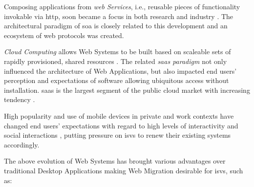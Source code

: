 Composing applications from \emph{\Gls{web} Services}, i.e., reusable pieces of functionality invokable via \gls{http}, soon became a focus in both research and industry \autocite{Kienle2014EvolutionWeb}.
The architectural paradigm of \gls{soa} \autocite{Oasis2006SOA} is closely related to this development and an ecosystem of \Gls{web} protocols \autocite{W3C2007WSDL2.0,W3C2003SOAP,OASIS2007BPEL} was created.

\emph{Cloud Computing} allows \glspl{Web System} to be built based on scaleable sets of rapidly provisioned, shared resources \autocite{NIST2011CloudComputing}.
The related \emph{\gls{saas} paradigm} not only influenced the architecture of \glspl{Web Application}, but also impacted end users' perception and expectations of software \autocite{BetterCloud2017SaaSWorkplace,Fowley2017CloudSME} allowing ubiquitous access without installation. 
\gls{saas} is the largest segment of the public cloud market with increasing tendency \autocite{Statista2018SaaSStatistics}.

High popularity and use of mobile devices \autocite{Statista2018MobileWeb} in private and work contexts have changed end users' expectations with regard to high levels of interactivity and social interactions \autocite{Bitkom2013Arbeit30}, putting pressure on \glspl{isv} to renew their existing systems accordingly.

The above evolution of \glspl{Web System} has brought various advantages over traditional \glspl{Desktop Application} making \gls{Web Migration} desirable for \glspl{isv}, such as:

